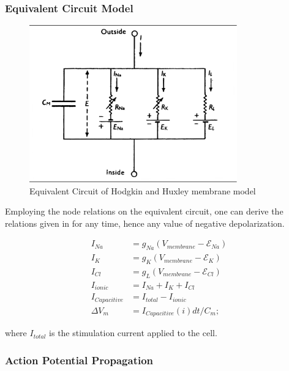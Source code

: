 \documentclass{IEEEtran}
\begin{document}
\subsubsection{Equivalent Circuit Model}
\begin{figure}[h]
\centering
\includegraphics[width=0.8\textwidth]{EQCCT.png}
\caption{Equivalent Circuit of Hodgkin and Huxley membrane model}\label{fig:eqcct}
\end{figure}

Employing the node relations on the equivalent circuit, one can derive the relations given in  for any time, hence any value of negative depolarization.

\begin{align}
    I_{Na} &= g_{Na}(V_{membrane} - \mathcal{E}_{Na}) \label{eqn:node1}\\
    I_{K} &= g_{K}(V_{membrane} - \mathcal{E}_{K}) \label{eqn:node2}\\
    I_{Cl} &= g_{L}(V_{membrane} - \mathcal{E}_{Cl}) \label{eqn:node3}\\
    I_{ionic} &= I_{Na} + I_{K} + I_{Cl} \label{eqn:kirch1}\\
    I_{Capacitive} &= I_{total} - I_{ionic} \label{eqn:kirch2}\\
    \Delta V_m &= I_{Capacitive}(i)dt / C_m; \label{eqn:cap}
\end{align}

where $I_{total}$ is the stimulation current applied to the cell. 

\subsubsection{Action Potential Propagation}
\end{document}
